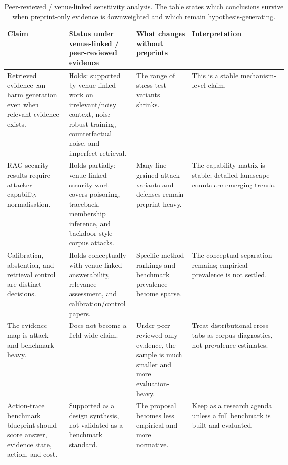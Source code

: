 \begin{table}[t]
\centering
\scriptsize
\renewcommand{\arraystretch}{0.94}
\begin{tabularx}{\linewidth}{>{\raggedright\arraybackslash}p{0.22\linewidth}>{\raggedright\arraybackslash}p{0.24\linewidth}>{\raggedright\arraybackslash}p{0.20\linewidth}X}
\toprule
\textbf{Claim} & \textbf{Status under venue-linked / peer-reviewed evidence} & \textbf{What changes without preprints} & \textbf{Interpretation} \\
\midrule
Retrieved evidence can harm generation even when relevant evidence exists. & Holds: supported by venue-linked work on irrelevant/noisy context, noise-robust training, counterfactual noise, and imperfect retrieval. & The range of stress-test variants shrinks. & This is a stable mechanism-level claim. \\
RAG security results require attacker-capability normalisation. & Holds partially: venue-linked security work covers poisoning, traceback, membership inference, and backdoor-style corpus attacks. & Many fine-grained attack variants and defenses remain preprint-heavy. & The capability matrix is stable; detailed landscape counts are emerging trends. \\
Calibration, abstention, and retrieval control are distinct decisions. & Holds conceptually with venue-linked answerability, relevance-assessment, and calibration/control papers. & Specific method rankings and benchmark prevalence become sparse. & The conceptual separation remains; empirical prevalence is not settled. \\
The evidence map is attack- and benchmark-heavy. & Does not become a field-wide claim. & Under peer-reviewed-only evidence, the sample is much smaller and more evaluation-heavy. & Treat distributional cross-tabs as corpus diagnostics, not prevalence estimates. \\
Action-trace benchmark blueprint should score answer, evidence state, action, and cost. & Supported as a design synthesis, not validated as a benchmark standard. & The proposal becomes less empirical and more normative. & Keep as a research agenda unless a full benchmark is built and evaluated. \\
\bottomrule
\end{tabularx}
\caption{Peer-reviewed / venue-linked sensitivity analysis. The table states which conclusions survive when preprint-only evidence is downweighted and which remain hypothesis-generating.}
\label{tab:peer-reviewed-sensitivity}
\end{table}

